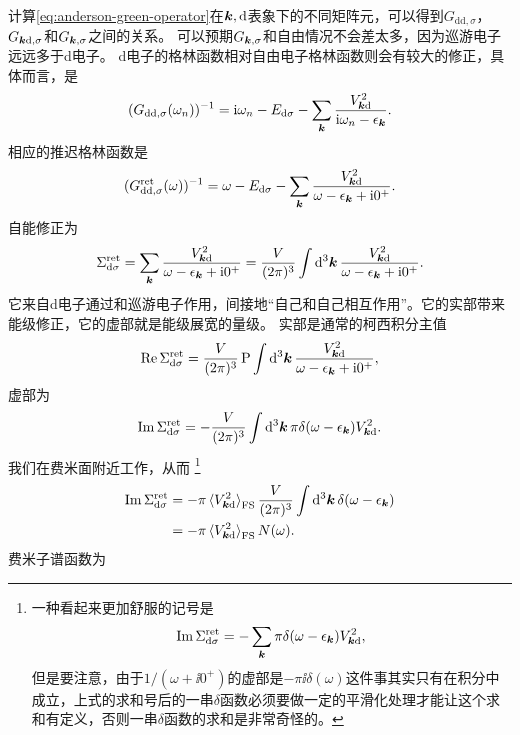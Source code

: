 计算\eqref{eq:anderson-green-operator}在$\vb*{k}, \text{d}$表象下的不同矩阵元，可以得到$G_{\text{dd}, \sigma}$，$G_{\vb*{k} \text{d}, \sigma}$和$G_{\vb*{k}, \sigma}$之间的关系。
可以预期$G_{\vb*{k}, \sigma}$和自由情况不会差太多，因为巡游电子远远多于d电子。
d电子的格林函数相对自由电子格林函数则会有较大的修正，具体而言，是
\begin{equation}
    (G_{\text{dd}, \sigma}(\omega_n))^{-1} = \mathrm{i} \omega_n - E_{\text{d}\sigma} - \sum_{\vb*{k}} \frac{V_{\vb*{k}\text{d}}^2}{\mathrm{i} \omega_n - \epsilon_{\vb*{k}}}.
\end{equation}
相应的推迟格林函数是
\begin{equation}
    (G_{\text{dd}, \sigma}^\text{ret}(\omega))^{-1} = \omega - E_{\text{d}\sigma} - \sum_{\vb*{k}} \frac{V_{\vb*{k}\text{d}}^2}{\omega - \epsilon_{\vb*{k}} + \mathrm{i} 0^+}.
\end{equation}
自能修正为
\begin{equation}
    \Sigma_{\text{d} \sigma}^\text{ret} = \sum_{\vb*{k}} \frac{V_{\vb*{k}\text{d}}^2}{\omega - \epsilon_{\vb*{k}} + \mathrm{i} 0^+} = \frac{V}{(2\pi)^3} \int \dd[3]{\vb*{k}} \frac{V_{\vb*{k}\text{d}}^2}{\omega - \epsilon_{\vb*{k}} + \mathrm{i} 0^+}.
\end{equation}
它来自d电子通过和巡游电子作用，间接地“自己和自己相互作用”。它的实部带来能级修正，它的虚部就是能级展宽的量级。
实部是通常的柯西积分主值
\[
    \Re \Sigma_{\text{d} \sigma}^\text{ret} = \frac{V}{(2\pi)^3} \operatorname{P} \int \dd[3]{\vb*{k}} \frac{V_{\vb*{k}\text{d}}^2}{\omega - \epsilon_{\vb*{k}} + \mathrm{i} 0^+},
\]
虚部为
\[
    \Im \Sigma_{\text{d} \sigma}^\text{ret} = - \frac{V}{(2\pi)^3} \int \dd[3]{\vb*{k}} \pi \delta(\omega - \epsilon_{\vb*{k}}) V_{\vb*{k} \text{d}}^2 .
\]
我们在费米面附近工作，从而%
\footnote{
    一种看起来更加舒服的记号是
    \[
        \Im \Sigma_{\text{d} \sigma}^\text{ret} = - \sum_{\vb*{k}} \pi \delta(\omega - \epsilon_{\vb*{k}}) V_{\vb*{k} \text{d}}^2,
    \]
    但是要注意，由于$1 / (\omega + \ii 0^+)$的虚部是$- \pi \ii \delta(\omega)$这件事其实只有在积分中成立，上式的求和号后的一串$\delta$函数必须要做一定的平滑化处理才能让这个求和有定义，否则一串$\delta$函数的求和是非常奇怪的。
}%
\[
    \begin{aligned}
        \Im \Sigma_{\text{d} \sigma}^\text{ret} &= - \pi \expval*{V_{\vb*{k} \text{d}}^2}_\text{FS} \frac{V}{(2\pi)^3} \int \dd[3]{\vb*{k}} \delta(\omega - \epsilon_{\vb*{k}}) \\
        &= - \pi \expval*{V_{\vb*{k} \text{d}}^2}_\text{FS} N(\omega).
    \end{aligned}
\]
费米子谱函数为
